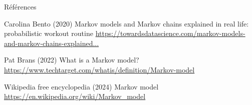 \documentclass[aspectratio=169,xcolor=dvipsnames, t]{beamer}
\begin{document}
\begin{frame}{Références}
    \footnotesize{
        \begin{thebibliography}{99}
             Carolina Bento (2020)
            \newblock Markov models and Markov chains explained in real life: probabilistic workout routine
            \newblock \href{https://towardsdatascience.com/markov-models-and-markov-chains-explained-in-real-life-probabilistic-workout-routine-65e47b5c9a73}{https://towardsdatascience.com/markov-models-and-markov-chains-explained...}
            
             Pat Brans (2022)
            \newblock What is a Markov model?
            \newblock \url{https://www.techtarget.com/whatis/definition/Markov-model}

             Wikipedia free encyclopedia (2024)
            \newblock Markov model
            \newblock \url{https://en.wikipedia.org/wiki/Markov_model}
            
        \end{thebibliography}
    }
\end{frame}

\makefinalpage
\end{document}
